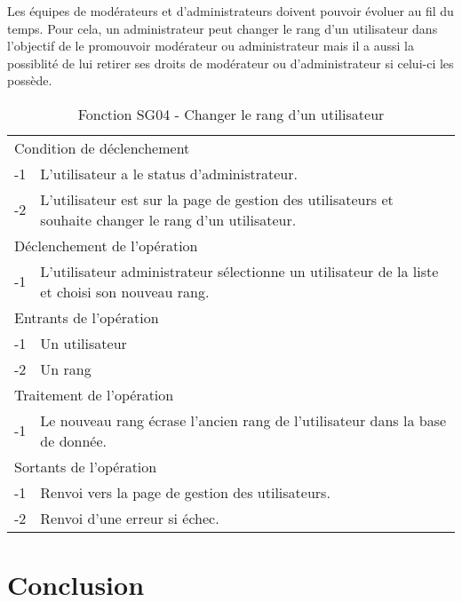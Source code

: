\documentclass[a4paper]{article}
\begin{document}
Les équipes de modérateurs et d'administrateurs doivent pouvoir évoluer au fil du temps. Pour cela, un administrateur peut changer le rang d'un utilisateur dans l'objectif de le promouvoir modérateur ou administrateur mais il a aussi la possiblité de lui retirer ses droits de modérateur ou d'administrateur si celui-ci les possède.

\begin{table}[H]
  \centering
   \small
	\begin{tabular}{|c|p{12cm}|}
   		\hline
   			\rowcolor{lightgray}\multicolumn{2}{|c|}{\textbf{Fonction SG04 - Changer le rang d'un utilisateur}} \\
   		\hline
   			\multicolumn{2}{|l|}{Condition de déclenchement} \\
   		\hline
   			-1 & L'utilisateur a le status d'administrateur.\\
        	-2 & L'utilisateur est sur la page de gestion des utilisateurs et souhaite changer le rang d'un utilisateur.\\
   		\hline
   			\multicolumn{2}{|l|}{Déclenchement de l'opération} \\
   		\hline
   			-1 & L'utilisateur administrateur sélectionne un utilisateur de la liste et choisi son nouveau rang.\\
   		\hline
   			\multicolumn{2}{|l|}{Entrants de l'opération} \\
   		\hline
   			-1 & Un utilisateur\\
            -2 & Un rang\\
   		\hline
   			\multicolumn{2}{|l|}{Traitement de l'opération} \\
  		\hline
   			-1 & Le nouveau rang écrase l'ancien rang de l'utilisateur dans la base de donnée.\\
   		\hline
   			\multicolumn{2}{|l|}{Sortants de l'opération} \\
   		\hline
   			-1 & Renvoi vers la page de gestion des utilisateurs.\\
        	-2 & Renvoi d'une erreur si échec.\\
   		\hline
	\end{tabular}
  \caption{Fonction SG04 - Changer le rang d'un utilisateur}
  \normalsize
  \label{tab: promouvoir_utilisateur}
\end{table}

\newpage
\section*{Conclusion}
\end{document}
